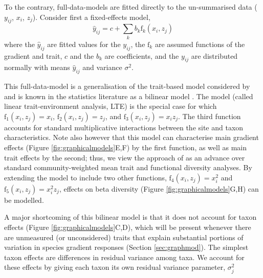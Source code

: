 \documentclass[12pt]{ecology}
\begin{document}
To the contrary, full-data-models are fitted directly to the un-summarised data ($y_{ij}$, $x_i$, $z_j$).  Consider first a fixed-effects model,
\begin{equation}
\hat{y}_{ij} = c + 
	\sum_k b_k \mathrm{f}_k (x_i, z_j)
\label{eq:fixed}
\end{equation}
where the $\hat{y}_{ij}$ are fitted values for the $y_{ij}$, the $\mathrm{f}_k$ are assumed functions of the gradient and trait, $c$ and the $b_k$ are coefficients, and the $y_{ij}$ are distributed normally with means $\hat{y}_{ij}$ and variance $\sigma^2$.

This full-data-model is a generalisation of the trait-based model considered by \citet{CormontEtAl2011} and is known in the statistics literature as a bilinear model \citep{Gabriel1998}.  The \citet{CormontEtAl2011} model (called linear trait-environment analysis, LTE) is the special case for which $\mathrm{f}_1(x_i, z_j) = x_i$, $\mathrm{f}_2(x_i, z_j) = z_j$, and $\mathrm{f}_3(x_i, z_j) = x_i z_j$.  The third function accounts for standard multiplicative interactions between the site and taxon characteristics.  Note also however that this model can characterise main gradient effects (Figure \ref{fig:graphicalmodels}E,F) by the first function, as well as main trait effects by the second; thus, we view the approach of \citet{CormontEtAl2011} as an advance over standard community-weighted mean trait and functional diversity analyses.  By extending the model to include two other functions, $\mathrm{f}_4(x_i, z_j) = x_i^2$ and $\mathrm{f}_5(x_i, z_j) = x_i^2 z_j$, effects on beta diversity (Figure \ref{fig:graphicalmodels}G,H) can be modelled.


A major shortcoming of this bilinear model is that it does not account for taxon effects (Figure \ref{fig:graphicalmodels}C,D), which will be present whenever there are unmeasured (or unconsidered) traits that explain substantial portions of variation in species gradient responses (Section \ref{sec:graphmod}).  The simplest taxon effects are differences in residual variance among taxa.  We account for these effects by giving each taxon its own residual variance parameter, $\sigma_j^2$
\end{document}
